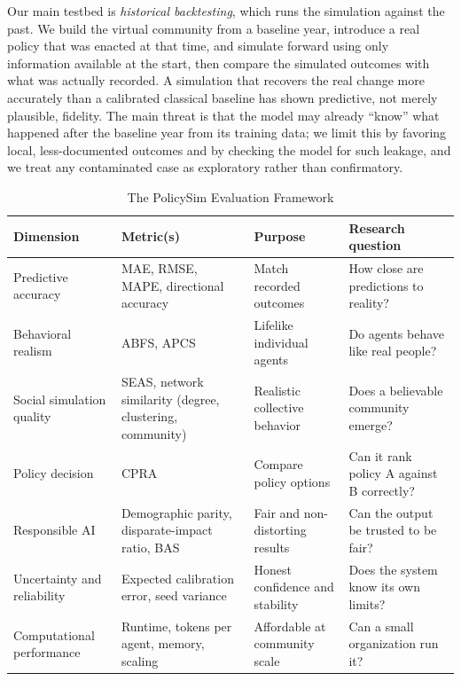\documentclass[conference]{IEEEtran}
\begin{document}
Our main testbed is \emph{historical backtesting}, which runs the simulation against the past. We build the virtual community from a baseline year, introduce a real policy that was enacted at that time, and simulate forward using only information available at the start, then compare the simulated outcomes with what was actually recorded. A simulation that recovers the real change more accurately than a calibrated classical baseline has shown predictive, not merely plausible, fidelity. The main threat is that the model may already ``know'' what happened after the baseline year from its training data; we limit this by favoring local, less-documented outcomes and by checking the model for such leakage, and we treat any contaminated case as exploratory rather than confirmatory.

\begin{table}[!t]
\caption{The PolicySim Evaluation Framework}
\label{tab:eval}
\centering
\renewcommand{\arraystretch}{1.3}
\footnotesize
\begin{tabular}{@{}p{2.5cm}p{4.0cm}p{4.0cm}p{4.6cm}@{}}
\toprule
\textbf{Dimension} & \textbf{Metric(s)} & \textbf{Purpose} & \textbf{Research question} \\
\midrule
Predictive accuracy & MAE, RMSE, MAPE, directional accuracy & Match recorded outcomes & How close are predictions to reality? \\
Behavioral realism & ABFS, APCS & Lifelike individual agents & Do agents behave like real people? \\
Social simulation quality & SEAS, network similarity (degree, clustering, community) & Realistic collective behavior & Does a believable community emerge? \\
Policy decision & CPRA & Compare policy options & Can it rank policy A against B correctly? \\
Responsible AI & Demographic parity, disparate-impact ratio, BAS & Fair and non-distorting results & Can the output be trusted to be fair? \\
Uncertainty and reliability & Expected calibration error, seed variance & Honest confidence and stability & Does the system know its own limits? \\
Computational performance & Runtime, tokens per agent, memory, scaling & Affordable at community scale & Can a small organization run it? \\
\bottomrule
\end{tabular}
\end{table}
\end{document}
